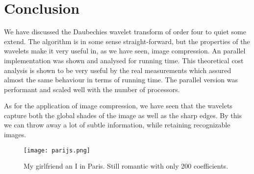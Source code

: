 
\section{Conclusion}
\label{sec:conc}

We have discussed the Daubechies wavelet transform of order four to quiet some extend. The algorithm is in some sense straight-forward, but the properties of the wavelets make it very useful in, as we have seen, image compression. An parallel implementation was shown and analysed for running time. This theoretical cost analysis is shown to be very useful by the real measurements which assured almost the same behaviour in terms of running time. The parallel version was performant and scaled well with the number of processors.

As for the application of image compression, we have seen that the wavelets capture both the global shades of the image as well as the sharp edges. By this we can throw away a lot of subtle information, while retaining recognizable images.

\vspace{3cm}
\begin{figure}
	\centering
	\texttt{[image: parijs.png]}
	\caption{My girlfriend an I in Paris. Still romantic with only 200 coefficients.}
\end{figure}
